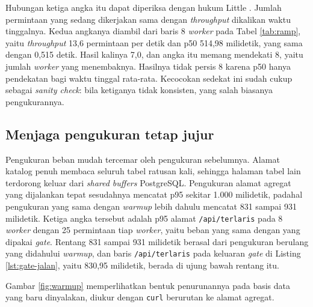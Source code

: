 Hubungan ketiga angka itu dapat diperiksa dengan hukum Little
\cite{gregg2020systems}. Jumlah permintaan yang sedang dikerjakan sama dengan
\textit{throughput} dikalikan waktu tinggalnya. Kedua angkanya diambil dari
baris 8 \textit{worker} pada Tabel \ref{tab:ramp}, yaitu \textit{throughput}
13,6 permintaan per detik dan p50 514,98 milidetik, yang sama dengan 0,515
detik. Hasil kalinya 7,0, dan angka itu memang mendekati 8, yaitu jumlah
\textit{worker} yang menembaknya. Hasilnya tidak persis 8 karena p50 hanya
pendekatan bagi waktu tinggal rata-rata. Kecocokan sedekat ini sudah cukup
sebagai \textit{sanity check}: bila ketiganya tidak konsisten, yang salah
biasanya pengukurannya.

\subsection*{Menjaga pengukuran tetap jujur}

Pengukuran beban mudah tercemar oleh pengukuran sebelumnya. Alamat katalog
penuh membaca seluruh tabel ratusan kali, sehingga halaman tabel lain
terdorong keluar dari \textit{shared buffers} PostgreSQL. Pengukuran alamat
agregat yang dijalankan tepat sesudahnya mencatat p95 sekitar 1.000
milidetik, padahal pengukuran yang sama dengan \textit{warmup} lebih dahulu
mencatat 831 sampai 931 milidetik. Ketiga angka tersebut adalah p95 alamat
\texttt{/api/terlaris} pada 8 \textit{worker} dengan 25 permintaan tiap
\textit{worker}, yaitu beban yang sama dengan yang dipakai \textit{gate}.
Rentang 831 sampai 931 milidetik berasal dari pengukuran berulang yang
didahului \textit{warmup}, dan baris \texttt{/api/terlaris} pada keluaran
\textit{gate} di Listing \ref{lst:gate-jalan}, yaitu 830,95 milidetik, berada
di ujung bawah rentang itu.

Gambar \ref{fig:warmup} memperlihatkan bentuk penurunannya pada basis data
yang baru dinyalakan, diukur dengan \texttt{curl} berurutan ke alamat
agregat.

